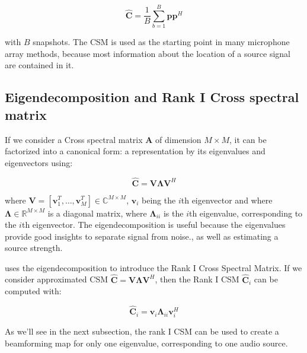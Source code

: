 \documentclass[11pt,a4paper,twoside]{report}
\begin{document}


\begin{equation}
    \label{csm}
    \hat{\mathbf{C}} = \frac{1}{B} \sum_{b = 1}^{B} \mathbf{p}\mathbf{p}^H
\end{equation}

with $B$ snapshots. The CSM is used as the starting point in many microphone array methods, because most information about the location of a source signal are contained in it.


\subsection{Eigendecomposition and Rank I Cross spectral matrix}

If we consider a Cross spectral matrix $\mathbf{A}$ of dimension $M \times M$, it can be factorized into a canonical form: a representation by its eigenvalues and eigenvectors using:

\begin{equation}
    \label{eigendecomposition}
    \hat{\mathbf{C}} = \mathbf{V} \mathbf{\Lambda} \mathbf{V}^H
\end{equation}

where $\mathbf{V} = [\mathbf{v}_1^T, \dots, \mathbf{v}_M^T] \in \mathbb{C}^{M \times M}$, $\mathbf{v}_i$ being the $i$th eigenvector and where $\mathbf{\Lambda} \in \mathbb{R}^{M \times M}$ is a diagonal matrix, where $\mathbf{\Lambda}_{ii}$ is the $i$th eigenvalue, corresponding to the $i$th eigenvector. The eigendecomposition is useful because the eigenvalues provide good insights to separate signal from noise., as well as estimating a source strength. 

\cite{sarradj2010fast} uses the eigendecomposition to introduce the Rank I Cross Spectral Matrix. If we consider approximated CSM $\hat{\mathbf{C}} = \mathbf{V} \mathbf{\Lambda} \mathbf{V}^H$, then the Rank I CSM $\hat{\mathbf{C}}_i$ can be computed with:

\begin{equation}
    \label{rank_I_csm}
    \hat{\mathbf{C}}_i = \mathbf{v}_i \mathbf{\Lambda}_{ii} \mathbf{v}_{i}^{H}
\end{equation}

As we'll see in the next subsection, the rank I CSM can be used to create a beamforming map for only one eigenvalue, corresponding to one audio source. 
\end{document}
